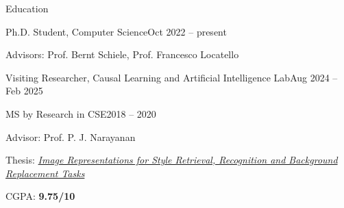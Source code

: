 \begin{cvsection}{Education}

        {Ph.D. Student, Computer Science}{Oct 2022 -- present}{%
  \begin{cvbullets}
    \item Advisors: Prof. Bernt Schiele, Prof. Francesco Locatello
  \end{cvbullets}}

        {Visiting Researcher, Causal Learning and Artificial Intelligence Lab}{Aug 2024 -- Feb 2025}{}

        {MS by Research in CSE}{2018 -- 2020}{%
  \begin{cvbullets}
    \item Advisor: Prof. P. J. Narayanan
    \item Thesis: \textit{\href{https://web2py.iiit.ac.in/research_centres/publications/view_publication/mastersthesis/828}{Image Representations for Style Retrieval, Recognition and Background Replacement Tasks}}
    \item CGPA: \textbf{9.75/10}
  \end{cvbullets}}


\end{cvsection}

